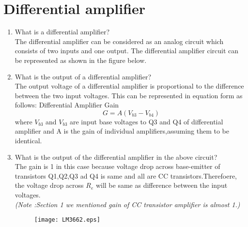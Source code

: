 \documentclass[journal,12pt,twocolumn]{IEEEtran}
\renewcommand\thesection{\arabic{section}}
\begin{document}
\section{Differential amplifier}
\begin{enumerate}[label=\thesection.\arabic*,ref=\thesection.\theenumi]
\item What is a differential amplifier?\\
\solution The differential amplifier can be considered as an analog circuit which consists of two inputs and one output. The differential amplifier circuit can be represented as shown in the figure below.\\
\item What is the output of a differential amplifier?\\
\solution The output voltage of a differential amplifier is proportional to the difference between the two input voltages. This can be represented in equation form as follows:
Differential Amplifier Gain $$G = A(V_{b3}-V_{b4})$$
where $V_{b3}$ and $V_{b3}$ are input base voltages to Q3 and Q4 of differential amplifier and A is the gain of individual amplifiers,assuming them to be identical.\\


\item What is the output of the differential amplifier in the above circuit?\\

 \solution The gain is 1 in this case because voltage drop across base-emitter of transistors Q1,Q2,Q3 ad Q4 is same and all are CC transistors.Therefoere, the voltage drop across $R_{e}$ will be same as difference between the input voltages.\\\textit{(Note :Section 1 we mentioned gain of CC transistor amplifier is almost 1.)}\\
 \begin{figure}[!ht]
\centering
\texttt{[image: LM3662.eps]}
\caption{}
\label{fig:1}
\end{figure}

\end{enumerate}
\end{document}
